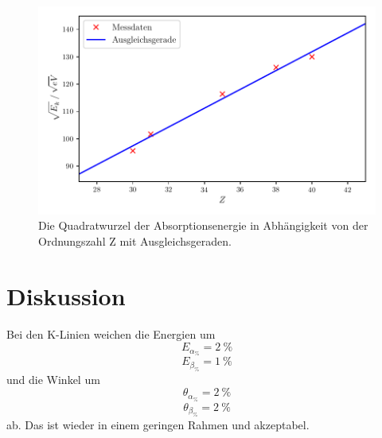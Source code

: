 \documentclass[a4paper]{scrartcl}
\begin{document}
\begin{figure}
  \centering
  \includegraphics{plot_moseley.pdf}
  \caption{Die Quadratwurzel der Absorptionsenergie in Abhängigkeit von der Ordnungszahl Z mit Ausgleichsgeraden.}
  \label{fig:moseley}
\end{figure}










%

\section{Diskussion}
Bei den K-Linien weichen die Energien um
\begin{equation*}
  E_{\alpha_{\%}}=2\ \%
\end{equation*}
\begin{equation*}
  E_{\beta_{\%}}=1\ \%
\end{equation*}
und die Winkel um
\begin{equation*}
  \theta_{\alpha_{\%}}=2\ \%
\end{equation*}
\begin{equation*}
  \theta_{\beta_{\%}}=2\ \%
\end{equation*}
ab. Das ist wieder in einem geringen Rahmen und akzeptabel.
\end{document}
